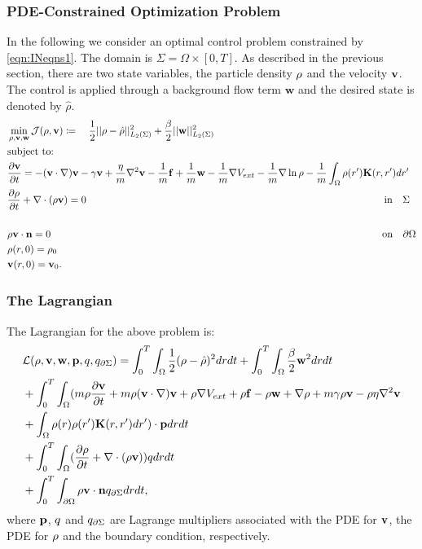 
\subsubsection{PDE-Constrained Optimization Problem}
In the following we consider an optimal control problem constrained by \eqref{eqn:INeqns1}. 
The domain is $\Sigma=\Omega \times [0,T]$. As described in the previous section, there are two state variables, the particle density $\rho$ and the velocity $\mathbf{v}$. The control is applied through a background flow term $\mathbf{w}$ and the desired state is denoted by $\hat \rho$. 
\begin{align*}
&\min_{\rho,\mathbf{v},\mathbf{w} } \mathcal J(\rho,\mathbf{v}) \coloneqq \quad \frac{1}{2}||\rho - \hat {\rho}||_{L_2(\Sigma)}^2  +\frac{\beta}{2}||\mathbf{w}||_{L_2(\Sigma)}^2\\
&\text{subject to:}\\
& \frac{\partial \mathbf{v}}{\partial t}= -  (\mathbf{v} \cdot \nabla)\mathbf{v} - \gamma  \mathbf{v} + \frac{\eta}{m} \nabla^2 \mathbf{v}  -\frac{1}{m}\mathbf{f} +\frac{1}{m}\mathbf{w} -\frac{1}{m} \nabla V_{ext} - \frac{1}{m}\nabla \ln \rho  -\frac{1}{m}\int_\Omega \rho(r') \mathbf{K}(r,r')dr' \\
&\frac{\partial \rho}{\partial t} + \nabla \cdot (\rho \mathbf{v})=0 \qquad\qquad \qquad\qquad\qquad\quad \quad\quad\qquad \qquad\qquad \qquad\qquad\qquad\quad \qquad\quad\ \ \text{in} \quad \Sigma\\
\\
&\rho \mathbf{v} \cdot \mathbf{n} =0\qquad\qquad \qquad\qquad\qquad\qquad\qquad\qquad\qquad \qquad\qquad \qquad\qquad\qquad \qquad\qquad\quad  \text{on} \quad \partial  \Omega\\
& \rho(r,0)=\rho_0\\
& \mathbf{v}(r,0)=\mathbf{v}_0.
\end{align*}

\subsubsection*{The Lagrangian}
The Lagrangian for the above problem is:
\begin{align*}
&\mathcal{L}(\rho,\mathbf{v},\mathbf{w},\mathbf{p},q,{q}_{\partial \Sigma}) = \int_0^T \int_\Omega  \frac{1}{2}(\rho - \hat {\rho})^2 drdt  +\int_0^T \int_\Omega  \frac{\beta}{2}\mathbf{w}^2 drdt\\
&+ \int_0^T \int_\Omega (m \rho \frac{\partial \mathbf{v}}{\partial t} + m \rho (\mathbf{v} \cdot \nabla)\mathbf{v} + \rho \nabla V_{ext} + \rho \mathbf{f} - \rho \mathbf{w} + \nabla \rho + m\gamma \rho \mathbf{v}  - \rho \eta \nabla^2 \mathbf{v}\\
&+\int_\Omega \rho(r) \rho(r') \mathbf{K}(r,r')dr') \cdot \mathbf{p} dr dt\\
& + \int_0^T \int_\Omega (\frac{\partial \rho}{\partial t} + \nabla \cdot (\rho \mathbf{v})) q dr dt\\ 
& +\int_0^T \int_{\partial\Omega} \rho \mathbf{v} \cdot \mathbf{n} {q}_{\partial \Sigma} dr dt,
\end{align*}
where $\mathbf{p}$, $q$ and ${q}_{\partial \Sigma}$ are Lagrange multipliers associated with the PDE for $\mathbf{v}$, the PDE for $\rho$ and the boundary condition, respectively.


